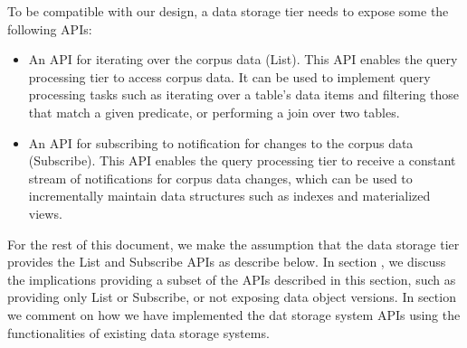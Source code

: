 To be compatible with our design, a data storage tier needs to expose some the following APIs:
\begin{itemize}
  \item An API for iterating over the corpus data (List).
  This API enables the query processing tier to access corpus data.
  It can be used to implement query processing tasks such as iterating over a table's data items and filtering those that
  match a given predicate, or performing a join over two tables.

  \item An API for subscribing to notification for changes to the corpus data (Subscribe).
  This API enables the query processing tier to receive a constant stream of notifications for corpus data changes,
  which can be used to incrementally maintain data structures such as indexes and materialized views.
\end{itemize}



For the rest of this document,
we make the assumption that the data storage tier provides the List and Subscribe APIs as describe below.
In section , we discuss the implications providing a subset of the APIs described in this section,
such as providing only List or Subscribe, or not exposing data object versions.
In section  we comment on how we have implemented the dat storage system APIs using the functionalities
of existing data storage systems.

